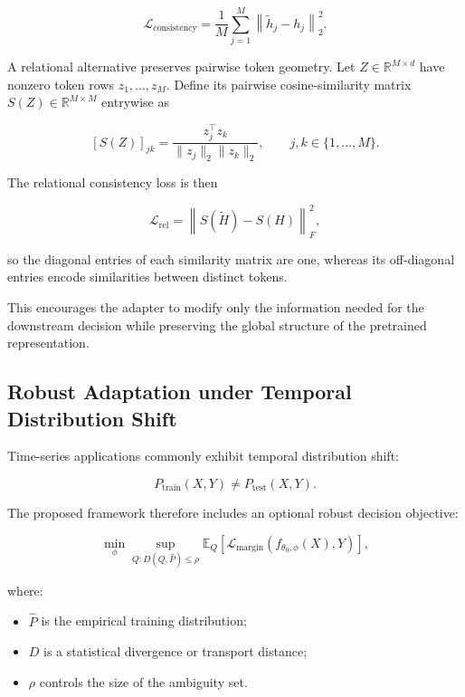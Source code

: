 \documentclass[11pt]{article}
\newcommand{\R}{\mathbb{R}}
\newcommand{\E}{\mathbb{E}}
\begin{document}
\begin{equation}
\mathcal{L}_{\mathrm{consistency}}
=
\frac{1}{M}
\sum_{j=1}^{M}
\left\|
\widetilde h_j-h_j
\right\|_2^2.
\end{equation}

A relational alternative preserves pairwise token geometry. Let
$Z\in\R^{M\times d}$ have nonzero token rows $z_1,\ldots,z_M$. Define its
pairwise cosine-similarity matrix $S(Z)\in\R^{M\times M}$ entrywise as

\begin{equation}
\left[S(Z)\right]_{jk}
=
\frac{z_j^\top z_k}
{\|z_j\|_2\|z_k\|_2},
\qquad
j,k\in\{1,\ldots,M\}.
\end{equation}

The relational consistency loss is then

\begin{equation}
\mathcal{L}_{\mathrm{rel}}
=
\left\|
S(\widetilde H)
-
S(H)
\right\|_F^2,
\end{equation}

so the diagonal entries of each similarity matrix are one, whereas its
off-diagonal entries encode similarities between distinct tokens.

This encourages the adapter to modify only the information needed for the
downstream decision while preserving the global structure of the pretrained
representation.

\subsection{Robust Adaptation under Temporal Distribution Shift}

Time-series applications commonly exhibit temporal distribution shift:

\begin{equation}
P_{\mathrm{train}}(X,Y)
\neq
P_{\mathrm{test}}(X,Y).
\end{equation}

The proposed framework therefore includes an optional robust decision
objective:

\begin{equation}
\min_{\phi}
\sup_{Q:
D(Q,\widehat P)\leq\rho}
\E_Q
\left[
\mathcal{L}_{\mathrm{margin}}
\left(
f_{\theta_0,\phi}(X),Y
\right)
\right],
\end{equation}

where:

\begin{itemize}
    \item $\widehat P$ is the empirical training distribution;
    \item $D$ is a statistical divergence or transport distance;
    \item $\rho$ controls the size of the ambiguity set.
\end{itemize}
\end{document}
